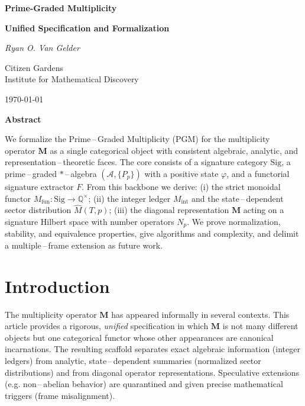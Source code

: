 \documentclass[11pt]{article}
\theoremstyle{definition}
\theoremstyle{plain}
\theoremstyle{remark}
\newcommand{\Sig}{\mathrm{Sig}}
\newcommand{\A}{\mathcal{A}}
\newcommand{\Qbb}{\mathbb{Q}}
\newcommand{\Mfun}{M_{\mathrm{fun}}}
\newcommand{\Mint}{M_{\mathrm{int}}}
\newcommand{\Mhat}{\widehat{M}}
\begin{document}
\begin{titlepage}
    \centering

    {\Huge\bfseries Prime-Graded Multiplicity}\\
    \vspace{0.5cm}
    {\LARGE\bfseries Unified Specification and Formalization \par}

    \vspace{2cm}
    {\LARGE\itshape Ryan O. Van Gelder \par}
    \vspace{1cm}
    {\Large Citizen Gardens} \\
    \vspace{0.5cm}
    \Large{Institute for Mathematical Discovery} \\ 
    \vspace{0.5cm}
    {\normalsize \today \par}

 \vfill

    {\bfseries Abstract \par}
    \vspace{0.5em}
    \begin{minipage}{0.85\textwidth}
        \small
We formalize the Prime\,–\,Graded Multiplicity (PGM) for the multiplicity operator $\mathbf M$ as a single categorical object with consistent algebraic, analytic, and representation\,–\,theoretic faces. The core consists of a signature category $\Sig$, a prime\,–\,graded $*$\,–\,algebra $(\A,\{P_p\})$ with a positive state $\varphi$, and a functorial signature extractor $F$. From this backbone we derive: (i) the strict monoidal functor $\Mfun: \Sig\to \Qbb^{\times}$; (ii) the integer ledger $\Mint$ and the state\,–\,dependent sector distribution $\Mhat(T,p)$; (iii) the diagonal representation $\mathbf M$ acting on a signature Hilbert space with number operators $N_p$. We prove normalization, stability, and equivalence properties, give algorithms and complexity, and delimit a multiple\,–\,frame extension as future work.
 \end{minipage}
\end{titlepage}

\newpage

\tableofcontents



\section{Introduction}
The multiplicity operator $\mathbf M$ has appeared informally in several contexts. This article provides a rigorous, \emph{unified} specification in which $\mathbf M$ is not many different objects but one categorical functor whose other appearances are canonical incarnations. The resulting scaffold separates exact algebraic information (integer ledgers) from analytic, state\,–\,dependent summaries (normalized sector distributions) and from diagonal operator representations. Speculative extensions (e.g. non\,–\,abelian behavior) are quarantined and given precise mathematical triggers (frame misalignment).
\end{document}

